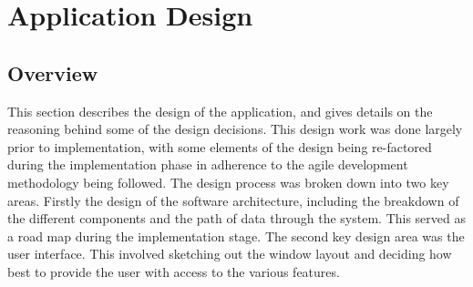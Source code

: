 
\chapter[Application Design]{Application Design} %

\label{Chapter8} %


\section{Overview}
This section describes the design of the application, and gives details on the reasoning behind some of the design decisions. This design work was done largely prior to implementation, with some elements of the design being re-factored during the implementation phase in adherence to the agile development methodology being followed. The design process was broken down into two key areas. Firstly the design of the software architecture, including the breakdown of the different components and the path of data through the system. This served as a road map during the implementation stage. The second key design area was the user interface. This involved sketching out the window layout and deciding how best to provide the user with access to the various features.


